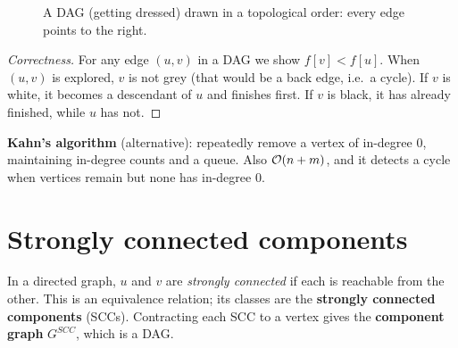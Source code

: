 \begin{figure}[H]
\centering
{}
\caption{A DAG (getting dressed) drawn in a topological order: every edge
points to the right.}
\end{figure}
\begin{proof}[Correctness]
For any edge $(u,v)$ in a DAG we show $f[v]<f[u]$. When $(u,v)$ is explored, $v$ is not grey (that would be a back edge, i.e.\ a cycle).
If $v$ is white, it becomes a descendant of $u$ and finishes first. If $v$ is black, it has already finished, while $u$ has not.
\end{proof}
\textbf{Kahn's algorithm} (alternative): repeatedly remove a vertex of in-degree 0, maintaining in-degree counts and a queue. Also $\mathcal{O}(n+m)$,
and it detects a cycle when vertices remain but none has in-degree 0.

\section{Strongly connected components}
In a directed graph, $u$ and $v$ are \emph{strongly connected} if each is reachable from the other. This is an equivalence relation; its classes are
the \textbf{strongly connected components} (SCCs). Contracting each SCC to a vertex gives the \textbf{component graph} $G^{SCC}$, which is a DAG.

